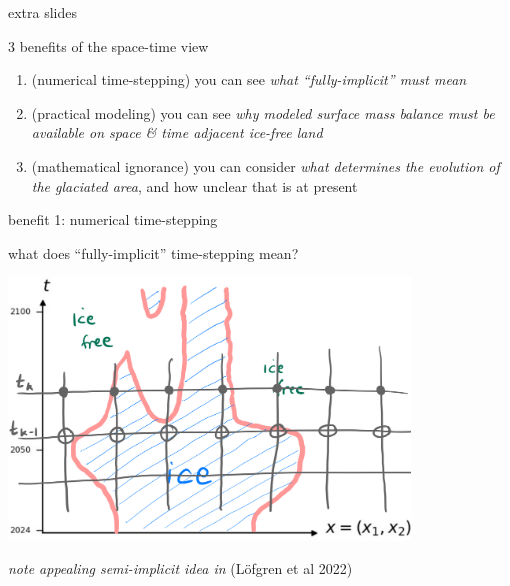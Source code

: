 \documentclass[10pt,dvipsnames]{beamer}
\begin{document}
\begin{frame}[standout]

extra slides
\end{frame}


\begin{frame}{3 benefits of the space-time view}

\begin{enumerate}
\item \alert{(numerical time-stepping)} you can see \emph{what ``fully-implicit'' must mean}
\item \alert{(practical modeling)} you can see \emph{why modeled surface mass balance must be available on space \& time adjacent ice-free land}
\item \alert{(mathematical ignorance)} you can consider \emph{what determines the evolution of the glaciated area}, and how unclear that is at present
\end{enumerate}

\end{frame}


\begin{frame}{benefit 1: numerical time-stepping}

what does ``fully-implicit'' time-stepping mean?

\medskip

\begin{center}
\includegraphics[width=0.8\textwidth]{implicitstep}
\end{center}

\medskip
{}

{\footnotesize \emph{note appealing semi-implicit idea in} (L\"ofgren et al 2022)}
\end{frame}
\end{document}
